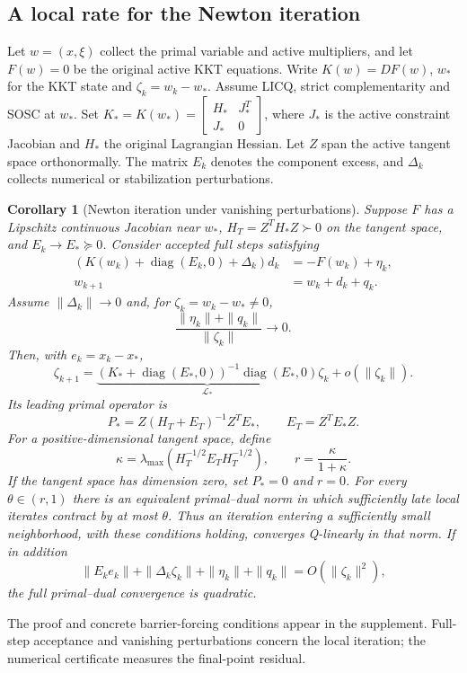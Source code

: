 \documentclass[pdflatex,sn-mathphys-num]{sn-jnl}
\theoremstyle{thmstyleone}
\newtheorem{corollary}[theorem]{Corollary}
\theoremstyle{thmstylethree}
\begin{document}
\subsection{A local rate for the Newton iteration}
Let $w=(x,\xi)$ collect the primal variable and active multipliers, and
let $F(w)=0$ be the original active KKT equations. Write $K(w)=DF(w)$,
$w_*$ for the KKT state and $\zeta_k=w_k-w_*$.
Assume LICQ, strict complementarity and SOSC at $w_*$. Set
$K_*=K(w_*)=[\begin{smallmatrix}H_*&J_*^T\\J_*&0\end{smallmatrix}]$,
where $J_*$ is the active constraint Jacobian and $H_*$ the original
Lagrangian Hessian. Let $Z$ span
the active tangent space orthonormally. The matrix $E_k$ denotes the component excess, and $\Delta_k$ collects
numerical or stabilization perturbations.
\begin{corollary}[Newton iteration under vanishing perturbations]
\label{cor:newton-realization}
Suppose $F$ has a Lipschitz continuous Jacobian near $w_*$,
$H_T=Z^TH_*Z\succ0$ on the tangent space, and
$E_k\to E_*\succeq0$. Consider accepted full steps satisfying
\begin{align}
 \left(K(w_k)+\operatorname{diag}(E_k,0)+\Delta_k\right)d_k
   &=-F(w_k)+\eta_k,\label{eq:one-newton}\\
 w_{k+1}&=w_k+d_k+q_k.
\end{align}
Assume $\|\Delta_k\|\to0$ and, for $\zeta_k=w_k-w_*\ne0$,
\[
 \frac{\|\eta_k\|+\|q_k\|}{\|\zeta_k\|}\longrightarrow0.
\]
Then, with $e_k=x_k-x_*$,
\begin{equation}\label{eq:one-newton-error}
 \zeta_{k+1}=
 \underbrace{\left(K_*+\operatorname{diag}(E_*,0)\right)^{-1}
 \operatorname{diag}(E_*,0)}_{\mathcal L_*}\zeta_k
 +o(\|\zeta_k\|).
\end{equation}
Its leading primal operator is
\[
 P_*=Z(H_T+E_T)^{-1}Z^TE_*,\qquad E_T=Z^TE_*Z.
\]
For a positive-dimensional tangent space, define
\[
 \kappa=\lambda_{\max}
 \left(H_T^{-1/2}E_TH_T^{-1/2}\right),\qquad
 r=\frac{\kappa}{1+\kappa}.
\]
If the tangent space has dimension zero, set $P_*=0$ and $r=0$.
For every $\theta\in(r,1)$ there is an equivalent primal--dual
norm in which sufficiently late local iterates contract by at most
$\theta$. Thus an iteration entering a sufficiently small
neighborhood, with these conditions holding, converges Q-linearly
in that norm. If in addition
\begin{equation}\label{eq:newton-quadratic-forcing}
 \|E_ke_k\|+\|\Delta_k\zeta_k\|+\|\eta_k\|+\|q_k\|
       =O(\|\zeta_k\|^2),
\end{equation}
the full primal--dual convergence is quadratic.
\end{corollary}
The proof and concrete barrier-forcing conditions appear in the supplement.
Full-step acceptance and vanishing perturbations concern the local
iteration; the numerical certificate measures the final-point residual.
\end{document}
